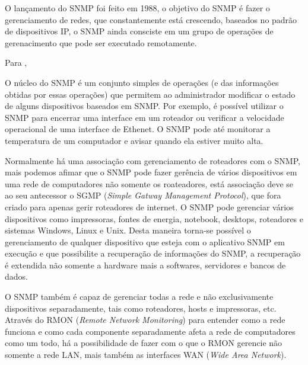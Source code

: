 \par  O lançamento do SNMP foi feito em 1988, o objetivo do SNMP é fazer o
gerenciamento de redes, que constantemente está crescendo, baseados no padrão de
dispositivos IP, o SNMP ainda consciste em um grupo de operações de
gerenacimento que pode ser executado remotamente.

\par Para ,

\begin{citacao}
	\par O núcleo do SNMP é um conjunto simples de operações (e das informações
	obtidas por essas operações) que permitem ao administrador modificar o estado
	de alguns dispositivos baseados em SNMP. Por exemplo, é possível utilizar o
	SNMP para encerrar uma interface em um roteador ou verificar a velocidade
	operacional de uma interface de Ethenet. O SNMP pode até monitorar a
	temperatura de um computador e avisar quando ela estiver muito alta.
\end{citacao}

\par Normalmente há uma associação com gerenciamento de roteadores com o SNMP,
mais podemos afimar que o SNMP pode fazer gerência de vários dispositivos em uma
rede de computadores não somente os roateadores, está associação deve se ao seu
antecessor o SGMP (\textit{Simple Gatway Management Protocol}), que fora criado
para apenas gerir roteadores de internet. O SNMP pode gerenciar vários
dispositivos como impressoras, fontes de energia, notebook, desktops,
roteadores e sistemas Windows, Linux e Unix. Desta maneira torna-se possível o
gerenciamento de qualquer dispositivo que esteja com o aplicativo SNMP em
execução e que possibilite a recuperação de informações do SNMP, a recuperação é
extendida não somente a hardware mais a softwares, servidores e bancos de dados.

\par O SNMP também é capaz de gerenciar todas a rede e não exclusivamente
dispositivos separadamente, tais como roteadores, hosts e impressoras, etc.
Através do RMON (\textit{Remote Network Monitoring}) para entender como a rede
funciona e como cada componente separadamente afeta a rede de computadores como
um todo, há a possibilidade de fazer com o que o RMON gerencie não somente a
rede LAN, mais também as interfaces WAN (\textit{Wide Area Network}).



